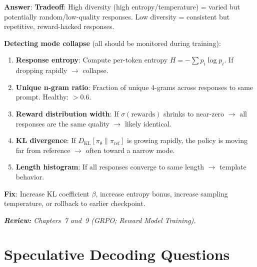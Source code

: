 \begin{questionbox}
\textbf{Answer}: \textbf{Tradeoff}: High diversity (high entropy/temperature) = varied but potentially random/low-quality responses. Low diversity = consistent but repetitive, reward-hacked responses.

\textbf{Detecting mode collapse} (all should be monitored during training):

\begin{enumerate}
  \item \textbf{Response entropy}: Compute per-token entropy $H = -\sum p_i \log p_i$. If dropping rapidly $\to$ collapse.
  \item \textbf{Unique n-gram ratio}: Fraction of unique 4-grams across responses to same prompt. Healthy: $>$0.6.
  \item \textbf{Reward distribution width}: If $\sigma(\text{rewards})$ shrinks to near-zero $\to$ all responses are the same quality $\to$ likely identical.
  \item \textbf{KL divergence}: If $D_\text{KL}[\pi_\theta \| \pi_\text{ref}]$ is growing rapidly, the policy is moving far from reference $\to$ often toward a narrow mode.
  \item \textbf{Length histogram}: If all responses converge to same length $\to$ template behavior.
\end{enumerate}

\textbf{Fix}: Increase KL coefficient $\beta$, increase entropy bonus, increase sampling temperature, or rollback to earlier checkpoint.

\emph{\textbf{Review:} Chapters~7 and~9 (GRPO; Reward Model Training).}
\end{questionbox}

\section{Speculative Decoding Questions}
\label{speculative-decoding-questions}

